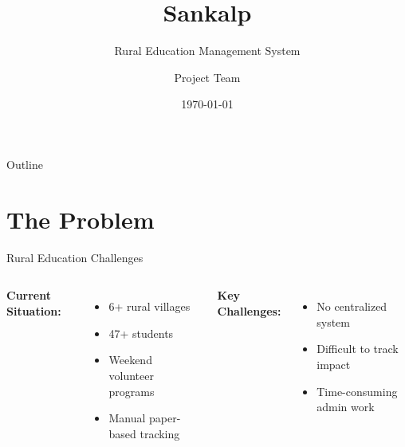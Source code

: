 \documentclass[aspectratio=169]{beamer}
\title{\textbf{Sankalp}}
\subtitle{Rural Education Management System}
\author{Project Team}
\date{\today}
\begin{document}
\begin{frame}
    \titlepage
\end{frame}

\begin{frame}{Outline}
    \tableofcontents
\end{frame}

\section{The Problem}

\begin{frame}{Rural Education Challenges}
    \begin{columns}
        \textbf{Current Situation:}
        \begin{itemize}
            \item 6+ rural villages
            \item 47+ students
            \item Weekend volunteer programs
            \item Manual paper-based tracking
        \end{itemize}
        
        \vspace{1em}
        
        \textbf{Key Challenges:}
        \begin{itemize}
            \item No centralized system
            \item Difficult to track impact
            \item Time-consuming admin work
        \end{itemize}
        
        \centering
    \end{columns}
\end{frame}

\end{document}
